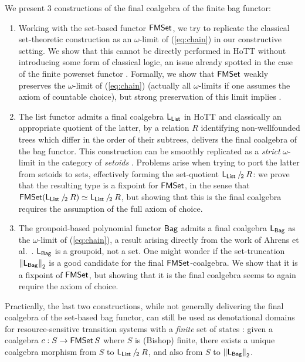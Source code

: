 \documentclass[runningheads]{llncs}
\begin{document}
We present 3 constructions of the final coalgebra of the finite bag functor:
\begin{enumerate}
\item Working with the set-based functor $\operatorname{\mathsf{FMSet}}$, we try to replicate the classical set-theoretic construction as an $\omega$-limit of (\ref{eq:chain}) in our constructive setting. We show that this cannot be directly performed in HoTT without introducing some form of classical logic, an issue already spotted in the case of the finite powerset functor \cite{Veltri2021}. Formally, we show that $\operatorname{\mathsf{FMSet}}$ weakly preserves the $\omega$-limit of (\ref{eq:chain}) (actually all $\omega$-limits if one assumes the axiom of countable choice), but strong preservation of this limit implies \LLPO{}.
\item The list functor admits a final coalgebra $\mathsf{L}_{\operatorname{\mathsf{List}}}$ in HoTT \cite{Ahrens2015} and classically an appropriate quotient of the latter, by a relation $R$ identifying non-wellfounded trees which differ in the order of their subtrees, delivers the final coalgebra of the bag functor. This construction can be smoothly replicated as a \emph{strict} $\omega$-limit in the category of \emph{setoids} \cite{Barthe2003}. Problems arise when trying to port the latter from setoids to sets, effectively forming the set-quotient $\mathsf{L}_{\operatorname{\mathsf{List}}} \mathbin{/_{\!2}} R$: we prove that the resulting type is a fixpoint for $\operatorname{\mathsf{FMSet}}$, in the sense that $\operatorname{\mathsf{FMSet}} (\mathsf{L}_{\operatorname{\mathsf{List}}} \mathbin{/_{\!2}} R) \simeq \mathsf{L}_{\operatorname{\mathsf{List}}} \mathbin{/_{\!2}} R$, but showing that this is the final coalgebra requires the assumption of the full axiom of choice. 
\item The groupoid-based polynomial functor $\operatorname{\mathsf{Bag}}$ admits a final coalgebra $\mathsf{L}_{\operatorname{\mathsf{Bag}}}$ as the $\omega$-limit of (\ref{eq:chain}), a result arising directly from the work of Ahrens et al.~\cite{Ahrens2015}. $\mathsf{L}_{\operatorname{\mathsf{Bag}}}$ is a groupoid, not a set. One might wonder if the set-truncation ${\lVert \mathsf{L}_{\operatorname{\mathsf{Bag}}} \rVert}_{\mathsf{2}}$ is a good candidate for the final $\operatorname{\mathsf{FMSet}}$-coalgebra. We  show that it is a fixpoint of $\operatorname{\mathsf{FMSet}}$, but showing that it is the final coalgebra seems to again require the axiom of choice. 
\end{enumerate}
Practically, the last two constructions, while not generally delivering the final coalgebra of the set-based bag functor, can still be used as denotational domains for resource-sensitive transition systems with a \emph{finite} set of states \cite{Frumin2018}: given a coalgebra $c : S \to \operatorname{\mathsf{FMSet}} S$ where $S$ is (Bishop) finite, there exists a unique coalgebra morphism from $S$ to $\mathsf{L}_{\operatorname{\mathsf{List}}} \mathbin{/_{\!2}} R$, and also from $S$ to ${\lVert \mathsf{L}_{\operatorname{\mathsf{Bag}}} \rVert}_{\mathsf{2}}$.
\end{document}
